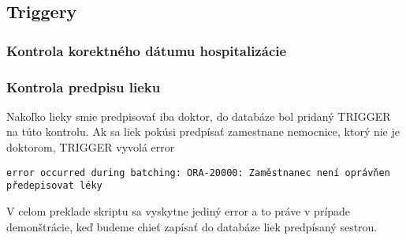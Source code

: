 \subsection{Triggery}

\subsubsection{Kontrola korektného dátumu hospitalizácie}

\subsubsection{Kontrola predpisu lieku}

Nakoľko lieky smie predpisovať iba doktor,
do databáze bol pridaný TRIGGER na túto kontrolu.
Ak sa liek pokúsi predpísať zamestnane nemocnice,
ktorý nie je doktorom, TRIGGER vyvolá error

\begin{lstlisting}[label={lst:oracle_console_error}]
    error occurred during batching: ORA-20000: Zaměstnanec není oprávňen předepisovat léky
\end{lstlisting}

V celom preklade skriptu sa vyskytne jediný error a to práve v prípade demonštrácie, keď budeme chieť zapísať do databáze
liek predpísaný sestrou.